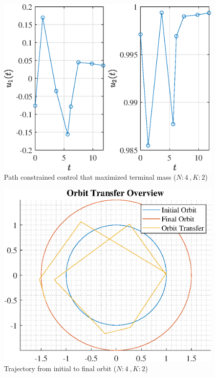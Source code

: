 \documentclass[]{article}
\begin{document}
\begin{figure}
	\centering
	\includegraphics[scale=0.75]{path_N4_K2_C3_mf.eps}
	\caption{Path constrained control that maximized terminal mass (\(N:4\ , K:2\))}
	\label{fig:path_N4_K2_C3_mf}
\end{figure}
\begin{figure}
	\centering
	\includegraphics[scale=0.75]{orbit_N4_K2_C3_mf.eps}
	\caption{Trajectory from initial to final orbit (\(N:4\ , K:2\))}
	\label{fig:orbit_N4_K2_C3_mf}
\end{figure}
\end{document}
